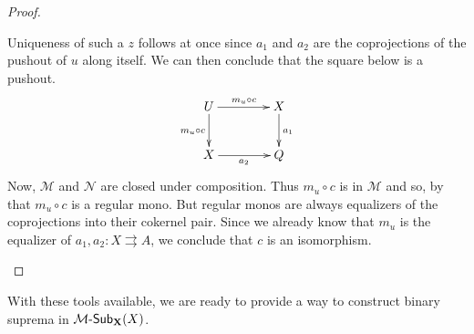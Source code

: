 \documentclass[a4paper]{article}
\newcommand{\sub}[3]{{\mathcal{#1}}\textrm{-}\mathsf{Sub}_{\textbf {\textup{#2}}}(#3)}
\def\X{\textbf {\textup{X}}}
\theoremstyle{definition}
\begin{document}
\begin{proof}
\begin{enumerate}
		Uniqueness of such a $z$ follows at once since $a_1$ and $a_2$ are the coprojections of the pushout of $u$ along itself.  We can then conclude that the square below is a pushout.
		\[\xymatrix@C=40pt{U \ar[r]^{m_u\circ c} \ar[d]_{m_u\circ c} & X \ar[d]^{a_1}\\  X\ar[r]_{a_2} &  Q }\]
		Now, $\mathcal{M}$ and $\mathcal{N}$ are closed under composition. Thus $m_u\circ c$ is in $\mathcal{M}$ and so, by  that $m_u\circ c$ is a regular mono. But regular monos are always equalizers of the coprojections into their cokernel pair. Since we already know that $m_u$ is the equalizer of $a_1, a_2\colon X \rightrightarrows A$, we conclude that $c$ is an isomorphism. 	\qedhere 
	\end{enumerate}
\end{proof}
 
With these tools available, we are ready to provide a way to construct binary suprema in $\sub{M}{\X}{X}$.
 
\end{document}
